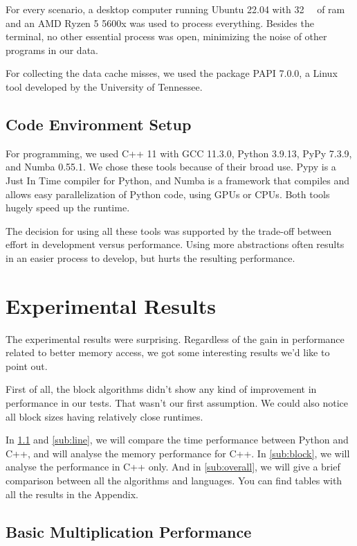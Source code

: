 \documentclass[sigconf,balance,nonacm]{acmart}
\begin{document}
For every scenario, a desktop computer running Ubuntu 22.04 with \qty{32}{\giga\byte} of ram and an AMD Ryzen 5 5600x was used to process everything.
Besides the terminal, no other essential process was open, minimizing the noise of other programs in our data.

For collecting the data cache misses, we used the package PAPI 7.0.0, a Linux tool developed by the University of Tennessee.

\subsection{Code Environment Setup}

For programming, we used C++ 11 with GCC 11.3.0, Python 3.9.13, PyPy 7.3.9, and Numba  0.55.1.
We chose these tools because of their broad use. Pypy is a Just In Time compiler for Python, and Numba is a framework that compiles and allows easy parallelization of Python code, using GPUs or CPUs.
Both tools hugely speed up the runtime.

The decision for using all these tools was supported by the trade-off between effort in development versus performance.
Using more abstractions often results in an easier process to develop, but hurts the resulting performance.

\section{Experimental Results}

The experimental results were surprising.
Regardless of the gain in performance related to better memory access, we got some interesting results we'd like to point out.

First of all, the block algorithms didn't show any kind of improvement in performance in our tests. That wasn't our first assumption.
We could also notice all block sizes having relatively close runtimes.

In \ref{sub:basic} and \ref{sub:line}, we will compare the time performance between Python and C++, and will analyse the memory performance for C++.
In \ref{sub:block}, we will analyse the performance in C++ only.
And in \ref{sub:overall}, we will give a brief comparison between all the algorithms and languages.
You can find tables with all the results in the Appendix.

\subsection{Basic Multiplication Performance}
\label{sub:basic}
\end{document}
